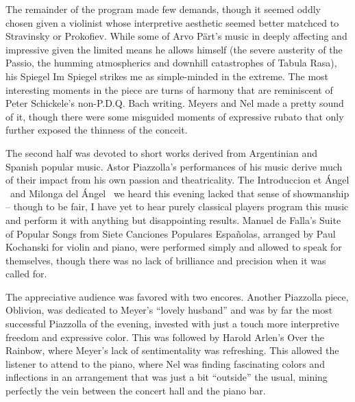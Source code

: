 The remainder of the program made few demands, though it seemed oddly chosen given a violinist whose interpretive aesthetic seemed better matchced to Stravinsky or Prokofiev. While some of Arvo Pärt’s music in deeply affecting and impressive given the limited means he allows himself (the severe austerity of the Passio, the humming atmospherics and downhill catastrophes of Tabula Rasa), his Spiegel Im Spiegel strikes me as simple-minded in the extreme. The most interesting moments in the piece are turns of harmony that are reminiscent of Peter Schickele’s non-P.D.Q. Bach writing. Meyers and Nel made a pretty sound of it, though there were some misguided moments of expressive rubato that only further exposed the thinness of the conceit.

The second half was devoted to short works derived from Argentinian and Spanish popular music. Astor Piazzolla’s performances of his music derive much of their impact from his own passion and theatricality. The Introduccion et Ángel  and Milonga del Ángel  we heard this evening lacked that sense of showmanship – though to be fair, I have yet to hear purely classical players program this music and perform it with anything but disappointing results. Manuel de Falla’s Suite of Popular Songs from Siete Canciones Populares Españolas, arranged by Paul Kochanski for violin and piano, were performed simply and allowed to speak for themselves, though there was no lack of brilliance and precision when it was called for.

The appreciative audience was favored with two encores. Another Piazzolla piece, Oblivion, was dedicated to Meyer’s “lovely husband” and was by far the most successful Piazzolla of the evening, invested with just a touch more interpretive freedom and expressive color. This was followed by Harold Arlen’s Over the Rainbow, where Meyer’s lack of sentimentality was refreshing. This allowed the listener to attend to the piano, where Nel was finding fascinating colors and inflections in an arrangement that was just a bit “outside” the usual, mining perfectly the vein between the concert hall and the piano bar.
